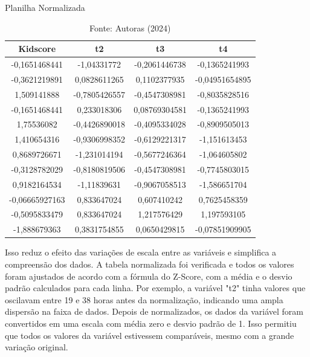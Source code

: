 \begin{table}[h!]
    \centering
    \renewcommand{\arraystretch}{1.2} 
    \captionsetup{font=footnotesize, justification=centering, labelsep=period, position=above}
    \caption{Planilha Normalizada}
    \label{tab:normalizacao}
    \begin{tabular}{|c|c|c|c|}
        \vspace{0.2cm} \cellcolor[HTML]{008940}  \textbf{Kidscore} & \cellcolor[HTML]{008940} \textbf{t2} & \cellcolor[HTML]{008940}  \textbf{t3} & \cellcolor[HTML]{008940}  \textbf{t4} \\
        
        \hline
        -0,1651468441 & -1,04331772 & -0,2061446738 & -0,1365241993 \\
        -0,3621219891 & 0,0828611265 & 0,1102377935 & -0,04951654895 \\
        1,509141888 & -0,7805426557 & -0,4547308981 & -0,8035828516 \\
        -0,1651468441 & 0,233018306 & 0,08769304581 & -0,1365241993 \\
        1,75536082 & -0,4426890018 & -0,4095334028 & -0,8909505013 \\
        1,410654316 & -0,9306998352 & -0,6129221317 & -1,151613453 \\
        0,8689726671 & -1,231014194 & -0,5677246364 & -1,064605802 \\
        -0,3128782029 & -0,8180819506 & -0,4547308981 & -0,7745803015 \\
        0,9182164534 & -1,11839631 & -0,9067058513 & -1,586651704 \\
        -0,06665927163 & 0,833647024 & 0,607410242 & 0,7625458359 \\
        -0,5095833479 & 0,833647024 & 1,217576429 & 1,197593105 \\
        -1,888679363 & 0,3831754855 & 0,0650429815 & -0,07851909905 \\
        \hline
    \end{tabular}
    \caption*{\scriptsize Fonte: Autoras (2024)}
\end{table}
\FloatBarrier

Isso reduz o efeito das variações de escala entre as variáveis e simplifica a compreensão dos dados. A tabela normalizada foi verificada e todos os valores foram ajustados de acordo com a fórmula do Z-Score, com a média e o desvio padrão calculados para cada linha. Por exemplo, a variável "t2" tinha valores que oscilavam entre 19 e 38 horas antes da normalização, indicando uma ampla dispersão na faixa de dados. Depois de normalizados, os dados da variável foram convertidos em uma escala com média zero e desvio padrão de 1. Isso permitiu que todos os valores da variável estivessem comparáveis, mesmo com a grande variação original.

